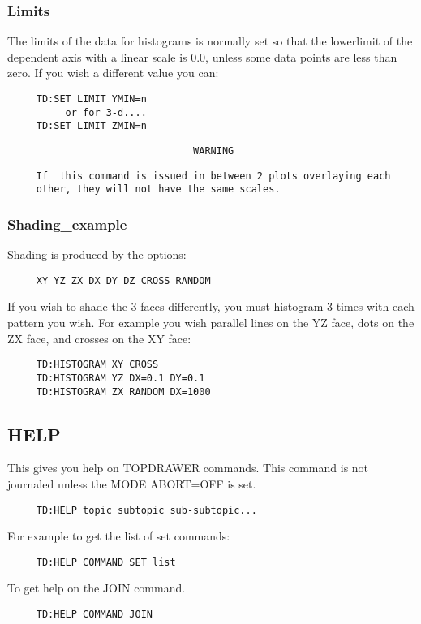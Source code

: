 \subsubsection{Limits}
The  limits  of  the  data  for  histograms is normally set so that the
lowerlimit of the dependent axis with a linear  scale  is  0.0,  unless
some data points are less than zero.  If you wish a different value you
can:  
\begin{verbatim}
     TD:SET LIMIT YMIN=n 
          or for 3-d....  
     TD:SET LIMIT ZMIN=n 
\end{verbatim}


\begin{verbatim}
                                WARNING
\end{verbatim}

\begin{verbatim}
     If  this command is issued in between 2 plots overlaying each
     other, they will not have the same scales.  
\end{verbatim}


\subsubsection{Shading\_example}
Shading is produced by the options:  
\begin{verbatim}
     XY YZ ZX DX DY DZ CROSS RANDOM 
\end{verbatim}
If  you  wish  to  shade  the 3 faces differently, you must histogram 3
times with each pattern you wish.  For example you wish parallel  lines
on the YZ face, dots on the ZX face, and crosses on the XY face:  
\begin{verbatim}
     TD:HISTOGRAM XY CROSS 
     TD:HISTOGRAM YZ DX=0.1 DY=0.1 
     TD:HISTOGRAM ZX RANDOM DX=1000 
\end{verbatim}
\subsection{HELP}
This gives you help on TOPDRAWER commands.  This command is not journaled
unless the MODE ABORT=OFF is set.  
\begin{verbatim}
     TD:HELP topic subtopic sub-subtopic...  
\end{verbatim}

For example to get the list of set commands:  
\begin{verbatim}
     TD:HELP COMMAND SET list 
\end{verbatim}
To get help on the JOIN command.  
\begin{verbatim}
     TD:HELP COMMAND JOIN 
\end{verbatim}
